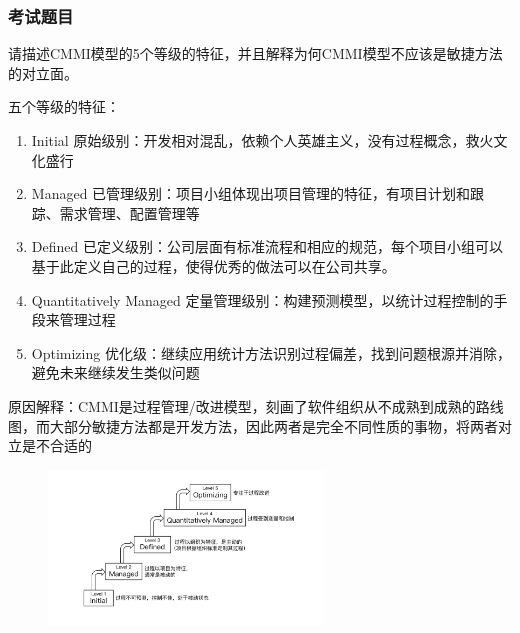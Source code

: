 \subsubsection{考试题目}
\begin{problem}
请描述CMMI模型的5个等级的特征，并且解释为何CMMI模型不应该是敏捷方法的对立面。

五个等级的特征：
\begin{enumerate}[label=\arabic*.]
    \item Initial 原始级别：开发相对混乱，依赖个人英雄主义，没有过程概念，救火文化盛行
    \item Managed 已管理级别：项目小组体现出项目管理的特征，有项目计划和跟踪、需求管理、配置管理等
    \item Defined 已定义级别：公司层面有标准流程和相应的规范，每个项目小组可以基于此定义自己的过程，使得优秀的做法可以在公司共享。
    \item Quantitatively Managed 定量管理级别：构建预测模型，以统计过程控制的手段来管理过程
    \item Optimizing 优化级：继续应用统计方法识别过程偏差，找到问题根源并消除，避免未来继续发生类似问题
\end{enumerate}

原因解释：CMMI是过程管理/改进模型，刻画了软件组织从不成熟到成熟的路线图，而大部分敏捷方法都是开发方法，因此两者是完全不同性质的事物，将两者对立是不合适的

\begin{figure}[H]
    \vspace{-0.5em}
	\centering
	\includegraphics[width=0.65\textwidth]{images/CMMI.pdf}
    \vspace{-1em}
\end{figure}

\end{problem}


